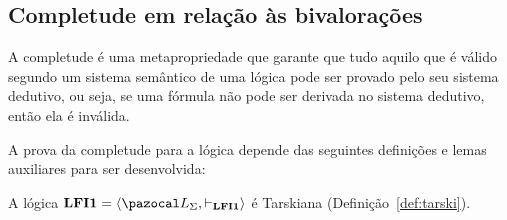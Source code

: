     \subsection{Completude em relação às bivalorações}\label{sec:comp}
        A completude é uma metapropriedade que garante que tudo aquilo que é válido segundo um sistema semântico de uma lógica pode ser provado pelo seu sistema dedutivo, ou seja, se uma fórmula não pode ser derivada no sistema dedutivo, então ela é inválida.

        A prova da completude para a lógica \lfium{} depende das seguintes definições e lemas auxiliares para ser desenvolvida:

        \begin{proposicao}\label{prop:tarski}        
            A lógica $\lfium{} = \langle \ling, \conhil \rangle$ é Tarskiana (Definição~\ref{def:tarski}).
        \end{proposicao}

